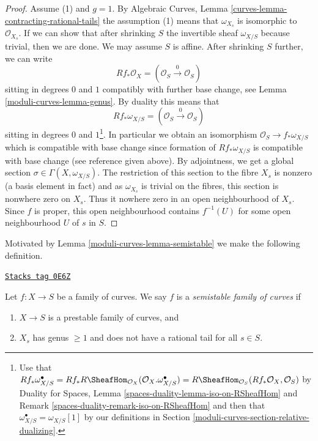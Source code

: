 \begin{proof}
\medskip\noindent
Assume (1) and $g = 1$. By
Algebraic Curves, Lemma \ref{curves-lemma-contracting-rational-tails}
the assumption (1) means that $\omega_{X_s}$ is isomorphic to
$\mathcal{O}_{X_s}$. If we can show that after shrinking $S$
the invertible sheaf $\omega_{X/S}$ because trivial, then
we are done. We may assume $S$ is affine. After shrinking $S$
further, we can write
$$
Rf_*\mathcal{O}_X = (\mathcal{O}_S \xrightarrow{0} \mathcal{O}_S)
$$
sitting in degrees $0$ and $1$
compatibly with further base change, see Lemma \ref{moduli-curves-lemma-genus}.
By duality this means that
$$
Rf_*\omega_{X/S} = (\mathcal{O}_S \xrightarrow{0} \mathcal{O}_S)
$$
sitting in degrees $0$ and $1$\footnote{Use that
$Rf_*\omega_{X/S}^\bullet =
Rf_*R\SheafHom_{\mathcal{O}_X}(\mathcal{O}_X. \omega_{X/S}^\bullet) =
R\SheafHom_{\mathcal{O}_S}(Rf_*\mathcal{O}_X, \mathcal{O}_S)$
by Duality for Spaces, Lemma \ref{spaces-duality-lemma-iso-on-RSheafHom} and
Remark \ref{spaces-duality-remark-iso-on-RSheafHom}
and then that $\omega_{X/S}^\bullet = \omega_{X/S}[1]$ by
our definitions in Section \ref{moduli-curves-section-relative-dualizing}.}.
In particular we obtain an isomorphism $\mathcal{O}_S \to f_*\omega_{X/S}$
which is compatible with base change since
formation of $Rf_*\omega_{X/S}$ is compatible with base change
(see reference given above).
By adjointness, we get a global section $\sigma \in \Gamma(X, \omega_{X/S})$.
The restriction of this section to the fibre $X_s$
is nonzero (a basis element in fact) and as
$\omega_{X_s}$ is trivial on the fibres,
this section is nonwhere zero on $X_s$.
Thus it nowhere zero in
an open neighbourhood of $X_s$. Since $f$ is proper, this open
neighbourhood contains $f^{-1}(U)$ for some open neighbourhood
$U$ of $s$ in $S$.
\end{proof}

Motivated by Lemma \ref{moduli-curves-lemma-semistable} we make the following definition.

\begin{definition}[Semistable]
\label{moduli-curves-definition-semistable}
\href{https://stacks.math.columbia.edu/tag/0E6Z}{\texttt{Stacks tag 0E6Z}}

Let $f : X \to S$ be a family of curves.
We say $f$ is a {\it semistable family of curves} if
\begin{enumerate}
\item $X \to S$ is a prestable family of curves, and
\item $X_s$ has genus $\geq 1$ and
does not have a rational tail for all $s \in S$.
\end{enumerate}
\end{definition}

